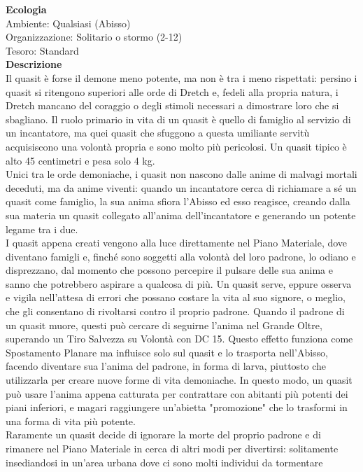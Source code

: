 \begin{multicols}{2}
\textbf{Ecologia}\\
Ambiente: Qualsiasi (Abisso)\\
Organizzazione: Solitario o stormo (2-12)\\
Tesoro: Standard\\
\textbf{Descrizione}\\
Il quasit è forse il demone meno potente, ma non è tra i meno rispettati: persino i quasit si ritengono superiori alle orde di Dretch e, fedeli alla propria natura, i Dretch mancano del coraggio o degli stimoli necessari a dimostrare loro che si sbagliano. Il ruolo primario in vita di un quasit è quello di famiglio al servizio di un incantatore, ma quei quasit che sfuggono a questa umiliante servitù acquisiscono una volontà propria e sono molto più pericolosi. Un quasit tipico è alto 45 centimetri e pesa solo 4 kg.\\
Unici tra le orde demoniache, i quasit non nascono dalle anime di malvagi mortali deceduti, ma da anime viventi: quando un incantatore cerca di richiamare a sé un quasit come famiglio, la sua anima sfiora l'Abisso ed esso reagisce, creando dalla sua materia un quasit collegato all'anima dell'incantatore e generando un potente legame tra i due.\\
I quasit appena creati vengono alla luce direttamente nel Piano Materiale, dove diventano famigli e, finché sono soggetti alla volontà del loro padrone, lo odiano e disprezzano, dal momento che possono percepire il pulsare delle sua anima e sanno che potrebbero aspirare a qualcosa di più. Un quasit serve, eppure osserva e vigila nell'attesa di errori che possano costare la vita al suo signore, o meglio, che gli consentano di rivoltarsi contro il proprio padrone. Quando il padrone di un quasit muore, questi può cercare di seguirne l'anima nel Grande Oltre, superando un Tiro Salvezza su Volontà con DC 15. Questo effetto funziona come Spostamento Planare ma influisce solo sul quasit e lo trasporta nell'Abisso, facendo diventare sua l'anima del padrone, in forma di larva, piuttosto che utilizzarla per creare nuove forme di vita demoniache. In questo modo, un quasit può usare l'anima appena catturata per contrattare con abitanti più potenti dei piani inferiori, e magari raggiungere un'abietta "promozione" che lo trasformi in una forma di vita più potente.\\
Raramente un quasit decide di ignorare la morte del proprio padrone e di rimanere nel Piano Materiale in cerca di altri modi per divertirsi: solitamente insediandosi in un'area urbana dove ci sono molti individui da tormentare\\



\end{multicols}
